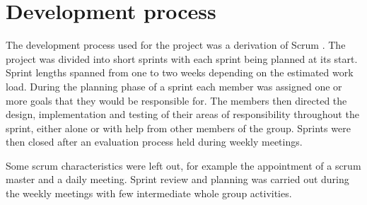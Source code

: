 \section{Development process}

The development process used for the project was a derivation of Scrum \cite{Scrum}. The project was divided into short sprints with each sprint being planned at its start. Sprint lengths spanned from one to two weeks depending on the estimated work load. During the planning phase of a sprint each member was assigned one or more goals that they would be responsible for. The members then directed the design, implementation and testing of their areas of responsibility throughout the sprint, either alone or with help from other members of the group. Sprints were then closed after an evaluation process held during weekly meetings. 

Some scrum characteristics were left out, for example the appointment of a scrum master and a daily meeting. Sprint review and planning was carried out during the weekly meetings with few intermediate whole group activities.
